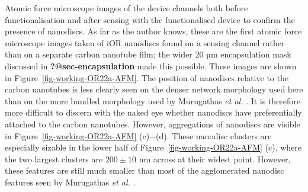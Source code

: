 \documentclass[
  a4paper,
]{scrbook}
\begin{document}
Atomic force microscope images of the device channels both before
functionalisation and after sensing with the functionalised device to
confirm the presence of nanodiscs. As far as the author knows, these are
the first atomic force microscope images taken of iOR nanodiscs found on
a sensing channel rather than on a separate carbon nanotube film; the
wider 20 µm encapsulation mask discussed in \textbf{?@sec-encapsulation}
made this possible. These images are shown in
Figure~\ref{fig-working-OR22a-AFM}. The position of nanodiscs relative
to the carbon nanotubes is less clearly seen on the denser network
morphology used here than on the more bundled morphology used by
Murugathas \emph{et al.} \autocite{Murugathas2019b}. It is therefore
more difficult to discern with the naked eye whether nanodiscs have
preferentially attached to the carbon nanotubes. However, aggregations
of nanodiscs are visible in Figure~\ref{fig-working-OR22a-AFM}
(c)\(-\)(d). These nanodisc clusters are especially sizable in the lower
half of Figure~\ref{fig-working-OR22a-AFM} (c), where the two largest
clusters are \(200\pm10\) nm across at their widest point. However,
these features are still much smaller than most of the agglomerated
nanodisc features seen by Murugathas \emph{et al.}
\autocite{Murugathas2019b}.
\end{document}
